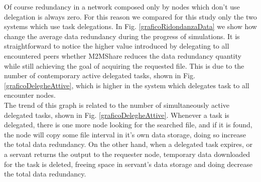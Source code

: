 Of course redundancy in a network composed only by nodes which don't use delegation is always zero. For this reason we compared for this study only the two systems which use task delegations. In Fig. \ref{graficoRidondanzaData} we show how change the average data redundancy during the progress of simulations. It is straightforward to notice the higher value introduced by delegating to all encountered peers whether M2MShare reduces the data redundancy quantity while still achieving the goal of acquiring the requested file. This is due to the number of contemporary active delegated tasks, shown in Fig. \ref{graficoDelegheAttive}, which is higher in the system which delegates task to all encounter nodes. 
\\
The trend of this graph is related to the number of simultaneously active delegated tasks, shown in Fig. \ref{graficoDelegheAttive}. Whenever a task is delegated, there is one more node looking for the searched file, and if it is found, the node will copy some file interval in it's own data storage, doing so increase the total data redundancy. On the other hand, when a delegated task expires, or a servant returns the output to the requester node, temporary data downloaded for the task is deleted, freeing space in servant's data storage and doing decrease the total data redundancy.


